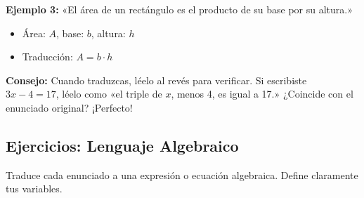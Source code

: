 \documentclass[12pt, letterpaper]{article}
\begin{document}
\noindent\textbf{Ejemplo 3:} «El área de un rectángulo es el producto de su base por su altura.»
\begin{itemize}
  \item Área: $A$, base: $b$, altura: $h$
  \item Traducción: $A = b \cdot h$
\end{itemize}

\begin{cuadroadvertencia}
  \textbf{Consejo:} Cuando traduzcas, léelo al revés para verificar. Si escribiste $3x - 4 = 17$, léelo como «el triple de $x$, menos 4, es igual a 17.» ¿Coincide con el enunciado original? ¡Perfecto!
\end{cuadroadvertencia}

\subsection{Ejercicios: Lenguaje Algebraico}
Traduce cada enunciado a una expresión o ecuación algebraica. Define claramente tus variables.
\end{document}
